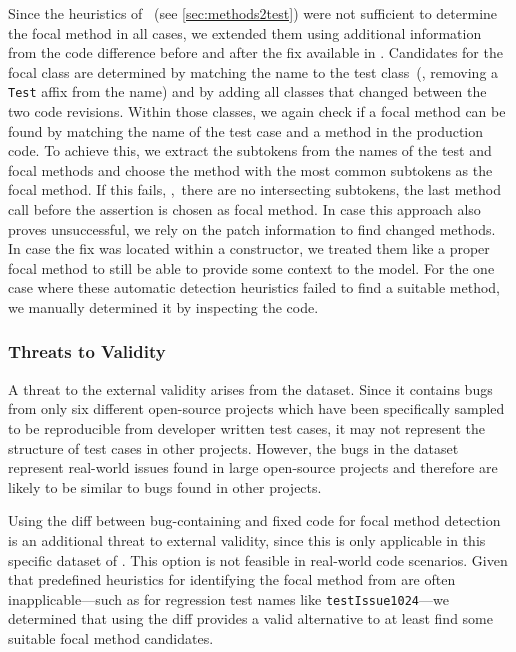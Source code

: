 Since the heuristics of \methodstotest~(see \cref{sec:methods2test})
were not sufficient to determine the focal method in all cases, we
extended them using additional information from the code difference
before and after the fix available in .
Candidates for the focal class are determined by matching the name to
the test class~(\ie, removing a \texttt{Test} affix from the name) and
by adding all classes that changed between the two code revisions.
Within those classes, we again check if a focal method can be found by
matching the name of the test case and a method in the production
code. To achieve this, we extract the subtokens from the names of the
test and focal methods and choose the method with the most common
subtokens as the focal method. If this fails, \ie,~there are no
intersecting subtokens, the last method call before the assertion is
chosen as focal method. In case this approach also proves
unsuccessful, we rely on the patch information to find changed
methods. In case the fix was located within a constructor, we treated
them like a proper focal method to still be able to provide some
context to the model.
For the one case where these automatic detection heuristics failed to
find a suitable method, we manually determined it by inspecting the
code.


\subsubsection{Threats to Validity}

A threat to the external validity arises from the 
dataset.  Since it contains bugs from only six different open-source
projects which have been specifically sampled to be reproducible from
developer written test cases, it may not represent the structure of
test cases in other projects. However, the bugs in the dataset
represent real-world issues found in large open-source projects and
therefore are likely to be similar to bugs found in other projects.

Using the diff between bug-containing and fixed code for focal method
detection is an additional threat to external validity, since this is
only applicable in this specific dataset of . This option
is not feasible in real-world code scenarios. Given that predefined
heuristics for identifying the focal method from \methodstotest are
often inapplicable---such as for regression test names like
\texttt{testIssue1024}---we determined that using the diff provides a
valid alternative to at least find some suitable focal method
candidates.

